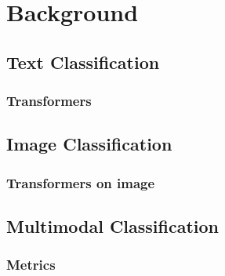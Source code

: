 \chapter{Background} \label{chap:background}
\section{Text Classification}
\subsection{Transformers}
\section{Image Classification}
\subsection{Transformers on image}
\section{Multimodal Classification}
\subsection{Metrics}